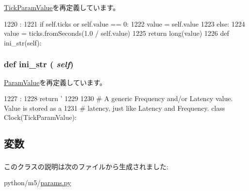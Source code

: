 \hyperlink{classm5_1_1params_1_1TickParamValue_acc340fbd4335fa34f9d57fb454b28ed0}{TickParamValue}を再定義しています。


\begin{DoxyCode}
1220                       :
1221         if self.ticks or self.value == 0:
1222             value = self.value
1223         else:
1224             value = ticks.fromSeconds(1.0 / self.value)
1225         return long(value)
1226 
    def ini_str(self):
\end{DoxyCode}
\hypertarget{classm5_1_1params_1_1Frequency_a33ebe6cd32bcbd15465fc28b9d94bf82}{
\subsubsection[{ini\_\-str}]{\setlength{\rightskip}{0pt plus 5cm}def ini\_\-str ( {\em self})}}
\label{classm5_1_1params_1_1Frequency_a33ebe6cd32bcbd15465fc28b9d94bf82}


\hyperlink{classm5_1_1params_1_1ParamValue_a33ebe6cd32bcbd15465fc28b9d94bf82}{ParamValue}を再定義しています。


\begin{DoxyCode}
1227                      :
1228         return '%
1229 
1230 # A generic Frequency and/or Latency value. Value is stored as a
1231 # latency, just like Latency and Frequency.
class Clock(TickParamValue):
\end{DoxyCode}


\subsection{変数}
\hypertarget{classm5_1_1params_1_1Frequency_a278a1f181e2be02613530daeaa8afdab}{
\subsubsection[{ticks}]{}}
\label{classm5_1_1params_1_1Frequency_a278a1f181e2be02613530daeaa8afdab}
\hypertarget{classm5_1_1params_1_1Frequency_afcc7a4b78ecd8fa7e713f8cfa0f51017}{
\subsubsection[{value}]{}}
\label{classm5_1_1params_1_1Frequency_afcc7a4b78ecd8fa7e713f8cfa0f51017}


このクラスの説明は次のファイルから生成されました:\begin{DoxyCompactItemize}
\item 
python/m5/\hyperlink{params_8py}{params.py}\end{DoxyCompactItemize}
